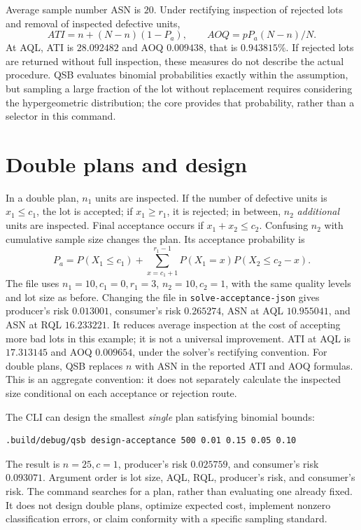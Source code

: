 Average sample number ASN is \(20\). Under rectifying inspection of rejected
lots and removal of inspected defective units,
\[
 ATI=n+(N-n)(1-P_a),\qquad AOQ=pP_a(N-n)/N.
\]
At AQL, ATI is \(28.092482\) and AOQ \(0.009438\), that is
\(0.943815\%\). If rejected lots are returned without full inspection,
these measures do not describe the actual procedure. QSB evaluates binomial
probabilities exactly within the assumption, but sampling a large fraction
of the lot without replacement requires considering the hypergeometric
distribution; the core provides that probability, rather than a selector in
this command.

\section{Double plans and design}
In a double plan, \(n_1\) units are inspected. If the number of defective
units is \(x_1\le c_1\), the lot is accepted; if \(x_1\ge r_1\), it is
rejected; in between, \(n_2\) \emph{additional} units are inspected. Final
acceptance occurs if \(x_1+x_2\le c_2\). Confusing \(n_2\) with cumulative
sample size changes the plan. Its acceptance probability is
\[
 P_a=P(X_1\le c_1)+
 \sum_{x=c_1+1}^{r_1-1}P(X_1=x)P(X_2\le c_2-x).
\]
The file  uses \(n_1=10,c_1=0,r_1=3\),
\(n_2=10,c_2=1\), with the same quality levels and lot size as before.
Changing the file in \texttt{solve-acceptance-json} gives producer's risk
\(0.013001\), consumer's risk \(0.265274\), ASN at AQL \(10.955041\),
and ASN at RQL \(16.233221\). It reduces average inspection at the cost
of accepting more bad lots in this example; it is not a universal improvement.
ATI at AQL is \(17.313145\) and AOQ \(0.009654\), under the solver's
rectifying convention. For double plans, QSB replaces \(n\) with ASN in
the reported ATI and AOQ formulas. This is an aggregate convention: it does
not separately calculate the inspected size conditional on each acceptance
or rejection route.

The CLI can design the smallest \emph{single} plan satisfying binomial bounds:
\begin{lstlisting}
.build/debug/qsb design-acceptance 500 0.01 0.15 0.05 0.10
\end{lstlisting}
The result is \(n=25,c=1\), producer's risk \(0.025759\), and consumer's
risk \(0.093071\). Argument order is lot size, AQL, RQL, producer's risk,
and consumer's risk. The command searches for a plan, rather than evaluating
one already fixed. It does not design double plans, optimize expected cost,
implement nonzero classification errors, or claim conformity with a specific
sampling standard.

